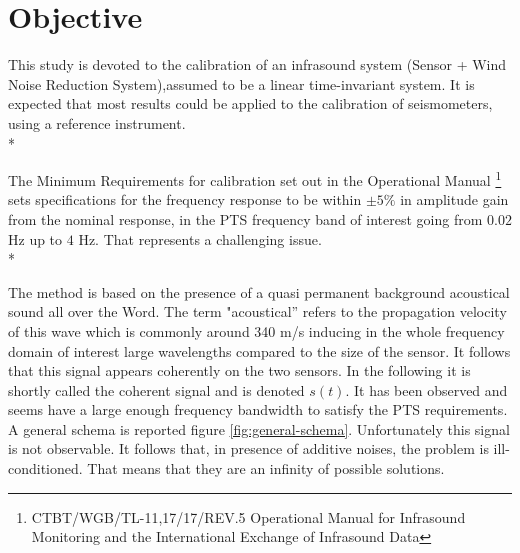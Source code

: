 \section{Objective}
{This study is devoted to the calibration of an infrasound system (Sensor + Wind Noise Reduction System),assumed to be a linear time-invariant system.
 It is expected that most results could be applied to the calibration of seismometers, using a reference instrument.\\*}

{The Minimum Requirements for calibration set out in the Operational Manual \footnote{CTBT/WGB/TL-11,17/17/REV.5 Operational Manual for Infrasound Monitoring and the International Exchange of Infrasound Data} sets specifications for the frequency response to be within $\pm 5\%$ in amplitude gain from the nominal response, in the PTS frequency band of interest going from $0.02$ Hz up to $4$ Hz}. That represents a challenging issue.\\*

 The method is based on the presence of a quasi permanent background acoustical sound all over the Word. The term "acoustical'' refers to the propagation velocity of this wave which is commonly around 340 m/s inducing in the whole frequency domain of interest large wavelengths compared to the size of the sensor. It follows that this signal appears coherently on the two sensors. In the following it is shortly called the coherent signal and is denoted $s(t)$. It has been observed and seems have a large enough frequency bandwidth to satisfy the PTS requirements. A general schema is reported figure \ref{fig:general-schema}. 
Unfortunately this signal is not observable. It follows that, in presence of additive noises, the problem is ill-conditioned. That means that they are an infinity of possible solutions.

